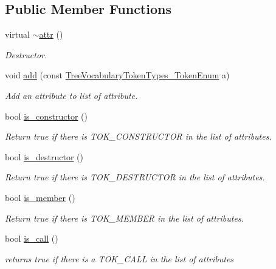 \subsection*{Public Member Functions}
\begin{DoxyCompactItemize}
\item 
virtual \hyperlink{structattr_ae4bfc0ef34097f42a635d59de25ba97a}{$\sim$attr} ()
\begin{DoxyCompactList}\small\item\em Destructor. \end{DoxyCompactList}\item 
void \hyperlink{structattr_ae6451da09b83a4d44c7e36b44f0a2593}{add} (const \hyperlink{token__interface_8hpp_a14502d0757789149f644966ca931b126}{Tree\+Vocabulary\+Token\+Types\+\_\+\+Token\+Enum} a)
\begin{DoxyCompactList}\small\item\em Add an attribute to list of attribute. \end{DoxyCompactList}\item 
bool \hyperlink{structattr_ac69c066beb6c45ac1e0cb44d785a652a}{is\+\_\+constructor} ()
\begin{DoxyCompactList}\small\item\em Return true if there is T\+O\+K\+\_\+\+C\+O\+N\+S\+T\+R\+U\+C\+T\+OR in the list of attributes. \end{DoxyCompactList}\item 
bool \hyperlink{structattr_a4dfbb6528d0735197b898f69a09ee6d2}{is\+\_\+destructor} ()
\begin{DoxyCompactList}\small\item\em Return true if there is T\+O\+K\+\_\+\+D\+E\+S\+T\+R\+U\+C\+T\+OR in the list of attributes. \end{DoxyCompactList}\item 
bool \hyperlink{structattr_a5ef429dca662d82cbc5474e40f2d6ab5}{is\+\_\+member} ()
\begin{DoxyCompactList}\small\item\em Return true if there is T\+O\+K\+\_\+\+M\+E\+M\+B\+ER in the list of attributes. \end{DoxyCompactList}\item 
bool \hyperlink{structattr_a7c932d5da3c3fa73a4ce6f4f1d432ca8}{is\+\_\+call} ()
\begin{DoxyCompactList}\small\item\em returns true if there is a T\+O\+K\+\_\+\+C\+A\+LL in the list of attributes \end{DoxyCompactList}\item 

\end{DoxyCompactItemize}
